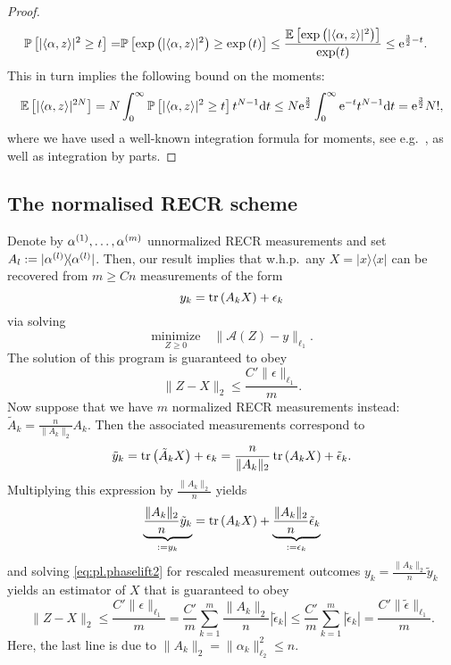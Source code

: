 \begin{proof}
\begin{align}
  \mathbb{P} \left[ | \langle \alpha, z \rangle|^2 \geq t \right]
  =& \mathbb{P} \left[ \exp \left( | \langle  \alpha, z \rangle|^2 \right) \geq \exp \left( t \right) \right]
  \leq \frac{ \mathbb{E} \left[ \exp \left( | \langle \alpha,  z \rangle|^2 \right) \right]}{\exp (t)} \leq \mathrm{e}^{\frac{3}{2}-t}.
\end{align}
This in turn implies the following bound on the moments:
\begin{align}
  \mathbb{E} \left[ | \langle  \alpha, z \rangle|^{2N} \right]
  =  N \int_0^\infty \mathbb{P}\left[ | \langle  \alpha, z \rangle|^2\geq t \right] t^{N-1} \mathrm{d}t \leq N \mathrm{e}^{\frac{3}{2}} \int_0^\infty \mathrm{e}^{-t} t^{N-1} \mathrm{d}t
  = \mathrm{e}^{\frac{3}{2}} N!,
\end{align}
where we have used a well-known integration formula for moments, see e.g.\ \cite[Prop.~7.1]{Foucart_2013_Mathematical}, as well as integration by parts.
\end{proof}


\subsection{The normalised RECR scheme}
\label{sub:pl.normalized_recr}


Denote by $\alpha^{(1)}, \ldots, \alpha^{(m)}$ unnormalized RECR measurements and set $A_l := \ketbra{\alpha\ind{l}}$.
Then, our result implies that w.h.p.\ any $ X = | x \rangle \!\langle  x|$ can be recovered from $m \geq  C n$ measurements of the form
\[
  y_k = \operatorname{tr} \left(  A_k  X \right) + \epsilon_k
\]
via solving
\[
  \underset{ Z\geq 0}{\textrm{minimize}} \quad \| \mathcal{A}( Z) -  y \|_{\ell_1}. \label{eq:pl.phaselift2}
\]
The solution of this program is guaranteed to obey
\[
  \|  Z -  X \|_2 \leq \frac{C' \| \epsilon \|_{\ell_1}}{m}.
\]
Now suppose that we have $m$ normalized RECR measurements instead: $\tilde{ A}_k = \frac{n}{\|  A_k \|_{2}}  A_k$. Then the associated measurements correspond to
\[
  \tilde{y}_k = \operatorname{tr} \left( \tilde{ A}_k X \right) + \epsilon_k = \frac{ n}{\|  A_k \|_2} \operatorname{tr} \left(  A_k X \right) + \tilde{\epsilon}_k.
\]
Multiplying this expression by $\frac{\|  A_k \|_2}{n}$ yields
\[
\underset{:= y_k}{\underbrace{ \frac{ \|  A_k \|_2}{n}\tilde{y}_k}}
= \operatorname{tr} \left(  A_k X \right) + \underset{:= \epsilon_k}{\underbrace{ \frac{ \|  A_k \|_2}{n}\tilde{\epsilon}_k}}
\]
and solving \eqref{eq:pl.phaselift2} for rescaled measurement outcomes $y_k = \frac{ \|  A_k \|_2}{n}\tilde{y}_k$ yields an estimator of $ X$ that is guaranteed to obey
\[
  \|  Z -  X \|_2 \leq \frac{C' \|  \epsilon \|_{\ell_1}}{m}
  = \frac{C'}{m} \sum_{k=1}^m \frac{ \|  A_k \|_2}{n} | \tilde{\epsilon}_k |
  \leq \frac{C'}{m} \sum_{k=1}^m | \tilde{\epsilon}_k| = \frac{C' \| \tilde{\epsilon} \|_{\ell_1}}{m}.
\]
Here, the last line is due to $\|  A_k \|_2 = \| \alpha_k \|_{\ell_2}^2 \leq n$.

